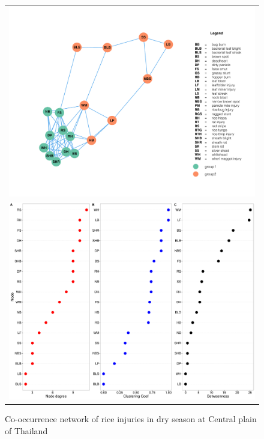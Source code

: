 \begin{figure}[h]
\begin{tabular}{c}
\includegraphics[width = 1\textwidth]{figures/network1.pdf}\\
\includegraphics[width = 1\textwidth]{figures/nodepropCP_ds.pdf}
\end{tabular}
\caption{Co-occurrence network of rice injuries in dry season at Central plain of Thailand}
\end{figure}


%

